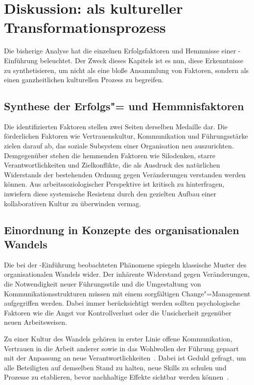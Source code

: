 \chapter{Diskussion: \DO als kultureller Transformationsprozess}
\label{ch:discussion}

Die bisherige Analyse hat die einzelnen Erfolgsfaktoren und Hemmnisse einer \DO-Einführung beleuchtet.
Der Zweck dieses Kapitels ist es nun, diese Erkenntnisse zu synthetisieren, um \DO nicht als eine bloße Ansammlung von Faktoren, sondern als einen ganzheitlichen kulturellen Prozess zu begreifen.

\section{Synthese der Erfolgs"= und Hemmnisfaktoren}
Die identifizierten Faktoren stellen zwei Seiten derselben Medaille dar.
Die förderlichen Faktoren wie Vertrauenskultur, Kommunikation und Führungsstärke zielen darauf ab, das soziale Subsystem einer Organisation neu auszurichten.
Demgegenüber stehen die hemmenden Faktoren wie Silodenken, starre Verantwortlichkeiten und Zielkonflikte, die als Ausdruck des natürlichen Widerstands der bestehenden Ordnung gegen Veränderungen verstanden werden können.
Aus arbeitssoziologischer Perspektive ist kritisch zu hinterfragen, inwiefern \DO diese systemische Resistenz durch den gezielten Aufbau einer kollaborativen Kultur zu überwinden vermag.

\section{Einordnung in Konzepte des organisationalen Wandels}

Die bei der \DO-Einführung beobachteten Phänomene spiegeln klassische Muster des organisationalen Wandels wider.
Der inhärente Widerstand gegen Veränderungen, die Notwendigkeit neuer Führungsstile und die Umgestaltung von Kommunikationsstrukturen müssen mit einem sorgfältigen Change"=Management aufgegriffen werden.
Dabei immer berücksichtigt werden sollten psychologische Faktoren wie die Angst vor Kontrollverlust oder die Unsicherheit gegenüber neuen Arbeitsweisen.

Zu einer Kultur des Wandels gehören in erster Linie offene Kommunikation, Vertrauen in die Arbeit anderer sowie in das Wohlwollen der Führung gepaart mit der Anpassung an neue Verantwortlichkeiten~\cite[281\psqq]{mas18}.
Dabei ist Geduld gefragt, um alle Beteiligten auf demselben Stand zu halten, neue Skills zu schulen und Prozesse zu etablieren, bevor nachhaltige Effekte sichtbar werden können~\cite[51354]{akb22}.

